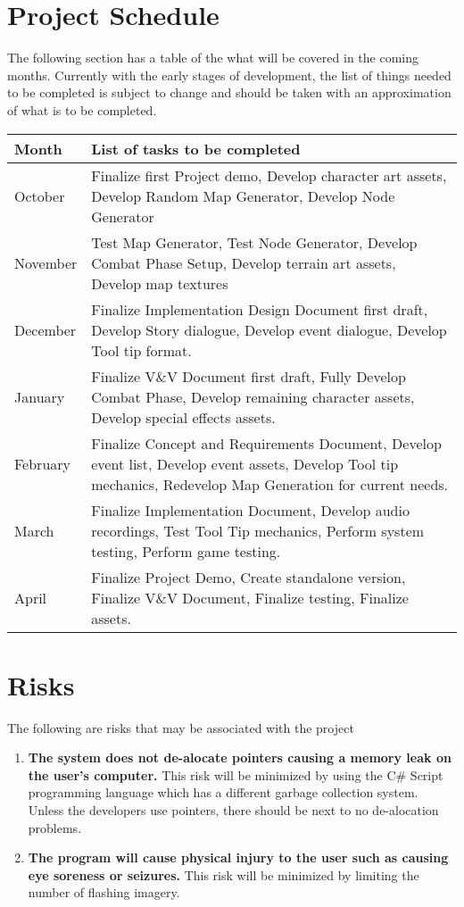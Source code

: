 \documentclass{article}
\begin{document}
\section{Project Schedule}
\quad The following section has a table of the what will be covered in the coming months. Currently with the early stages of development, the list of things needed to be completed is subject to change and should be taken with an approximation of what is to be completed.
\begin{center}
\begin{tabular}{ | m{5em} | m{10cm}|} 
\hline
Month & List of tasks to be completed \\ 
\hline
October & Finalize first Project demo, Develop character art assets, Develop Random Map Generator, Develop Node Generator \\ 
\hline
November & Test Map Generator, Test Node Generator, Develop Combat Phase Setup, Develop terrain art assets, Develop map textures \\ 
\hline
December & Finalize Implementation Design Document first draft, Develop Story dialogue, Develop event dialogue, Develop Tool tip format. \\ 
\hline
January &  Finalize V\&V Document first draft, Fully Develop Combat Phase, Develop remaining character assets, Develop special effects assets. \\ 
\hline
February & Finalize Concept and Requirements Document, Develop event list, Develop event assets, Develop Tool tip mechanics, Redevelop Map Generation for current needs. \\ 
\hline
March & Finalize Implementation Document, Develop audio recordings, Test Tool Tip mechanics, Perform system testing, Perform game testing.\\ 
\hline
April & Finalize Project Demo, Create standalone version, Finalize V\&V Document, Finalize testing, Finalize assets. \\ 
\hline
\end{tabular}
\end{center}
\section{Risks}
\quad The following are risks that may be associated with the project
\begin{enumerate}[{R}1. ]
	\item \textbf{The system does not de-alocate pointers causing a memory leak on the user's computer.} This risk will be minimized by using the C\# Script programming language which has a different garbage collection system. Unless the developers use pointers, there should be next to no de-alocation problems.
	\item \textbf{The program will cause physical injury to the user such as causing eye soreness or seizures.} This risk will be minimized by limiting the number of flashing imagery.
\end{enumerate}
\end{document}
